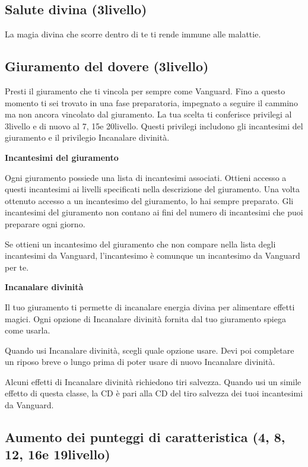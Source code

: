 \documentclass[a4paper,10pt,twoside,twocolumn,openany,bg=full,nodeprecatedcode]{dndbook}
\begin{document}
\subsection{Salute divina (3\degree livello)}

La magia divina che scorre dentro di te ti rende immune alle malattie.

\subsection{Giuramento del dovere (3\degree livello)}

Presti il giuramento che ti vincola per sempre come Vanguard.
Fino a questo momento ti sei trovato in una fase preparatoria, impegnato a seguire il cammino ma non ancora vincolato dal giuramento.
La tua scelta ti conferisce privilegi al 3\degree livello e di nuovo al 7\degree, 15\degree e 20\degree livello.
Questi privilegi includono gli incantesimi del giuramento e il privilegio Incanalare divinità.

\textbf{Incantesimi del giuramento}

Ogni giuramento possiede una lista di incantesimi associati.
Ottieni accesso a questi incantesimi ai livelli specificati nella descrizione del giuramento.
Una volta ottenuto accesso a un incantesimo del giuramento, lo hai sempre preparato.
Gli incantesimi del giuramento non contano ai fini del numero di incantesimi che puoi preparare ogni giorno.

Se ottieni un incantesimo del giuramento che non compare nella lista degli incantesimi da Vanguard, l'incantesimo è comunque un incantesimo da Vanguard per te.

\textbf{Incanalare divinità}

Il tuo giuramento ti permette di incanalare energia divina per alimentare effetti magici.
Ogni opzione di Incanalare divinità fornita dal tuo giuramento spiega come usarla.

Quando usi Incanalare divinità, scegli quale opzione usare.
Devi poi completare un riposo breve o lungo prima di poter usare di nuovo Incanalare divinità.

Alcuni effetti di Incanalare divinità richiedono tiri salvezza.
Quando usi un simile effetto di questa classe, la CD è pari alla CD del tiro salvezza dei tuoi incantesimi da Vanguard.

\subsection{Aumento dei punteggi di caratteristica (4\degree, 8\degree, 12\degree, 16\degree e 19\degree livello)}
\end{document}
